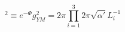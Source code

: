 \begin{equation} [g_{YM}^0]^2 \equiv e^{-\Phi}g_{YM}^2= 2\pi
\prod_{i=1}^3 2\pi\sqrt{\alpha'}L_i^{-1}\label{ym0}
\end{equation}

